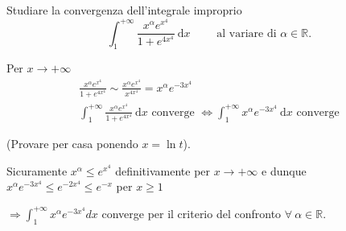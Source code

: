 \begin{exbar}
\begin{example}
		
	Studiare la convergenza dell'integrale improprio 
	\begin{equation*}
		\int_{1}^{+\infty} \frac{x^\alpha e^{x^4}}{1+e^{4x^4}} \ \mathrm{d}x \qquad \text{ al variare di } \alpha \in \mathbb{R}.
	\end{equation*}
	
	Per $x \rightarrow +\infty$
	\begin{gather*}
		\frac{x^\alpha e^{x^4}}{1+e^{4x^4}} \sim \frac{x^\alpha e^{x^4}}{x^{4x^4}} = x^\alpha e^{-3x^4}
		\\
		\int_{1}^{+\infty}\frac{x^\alpha e^{x^4}}{1+e^{4x^4}} \ \mathrm{d}x \text{ converge } \iff \int_{1}^{+\infty} x^\alpha e^{-3x^4} \ \mathrm{d}x \text{ converge}
	\end{gather*}
	
	(Provare per casa ponendo $x=\ln t$).
	
	Sicuramente $x^\alpha \leq e^{x^4}$ definitivamente per $x \rightarrow +\infty$ e dunque $x^\alpha e^{-3x^4} \leq e^{-2x^4}\leq e^{-x} $ per $x \geq 1$
	
	$\Rightarrow \int_{1}^{+\infty} x^\alpha e^{-3x^4}dx $ converge per il criterio del confronto $\forall \ \alpha \in \mathbb{R}$.
\end{example}
\end{exbar}


